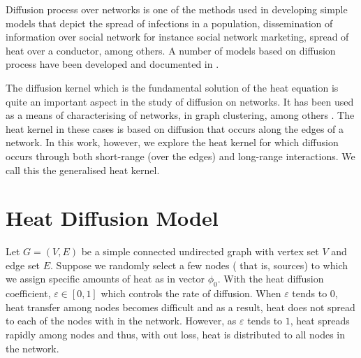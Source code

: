 \documentclass[12pt]{article}
\begin{document}
Diffusion process over networks is one of the methods used in developing simple models that depict the spread of infections in a population, dissemination of information over social network for instance social network marketing, spread of heat over a conductor, among others. A number of models based on diffusion process have been developed and documented in \citep{estrada2011epidemic,kasprzak2012diffusion,lopez2008diffusion}.

The diffusion kernel which is the fundamental solution of the heat equation is quite an important aspect in the study of diffusion on networks. It has been used as a means of characterising of networks, in graph clustering, among others \citep{xiao2009graph}. The heat kernel in these cases is based on diffusion that occurs along the edges of a network. In this work, however, we explore the heat kernel for which diffusion occurs through both short-range (over the edges) and long-range interactions. We call this the generalised heat kernel.

\section{Heat Diffusion Model}
  Let $G=(V,E)$ be a simple connected undirected graph with vertex set $V$ and edge set $E$. Suppose we randomly select a few nodes ( that is, sources) to which we assign specific amounts of heat as in vector $\phi_0$. With the heat diffusion coefficient, $\varepsilon \in [0,1]$ which controls the rate of diffusion. When $\varepsilon$ tends to $0$, heat transfer among nodes becomes difficult and as a result, heat does not spread to each of the nodes with in the network. However, as $\varepsilon$ tends to $1$, heat spreads rapidly among nodes and thus, with out loss, heat is distributed to all nodes in the network.
 
\end{document}
